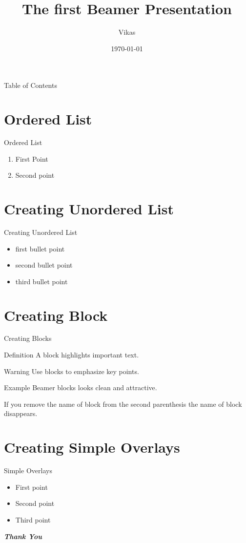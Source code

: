 \documentclass[12 pt]{beamer}
\title{The first Beamer Presentation}
\author{Vikas}
\institute{Ramjas College, UOD}
\date{\today}
\begin{document}
\maketitle
\tableofcontents

\begin{frame}{Table of Contents}
\tableofcontents
\end{frame}
\section{Ordered List}
\begin{frame}{Ordered List}
\begin{enumerate}
\item First Point
\item Second point
\end{enumerate}
\end{frame}
\section{Creating Unordered List}
\begin{frame}{Creating Unordered List}
\begin{itemize}
\item first bullet point
\item second bullet point
\item third bullet point
\end{itemize}
\end{frame}
\section{Creating Block}
\begin{frame}{Creating Blocks}
\begin{block}{Definition}
A block highlights important text.
\end{block}
\begin{alertblock}{Warning}
Use blocks to emphasize key points.
\end{alertblock}
\begin{exampleblock}{Example}
Beamer blocks looks clean and attractive.
\end{exampleblock}
\begin{exampleblock}{}
If you remove the name of block from the second parenthesis the name of block
disappears.
\end{exampleblock}
\end{frame}
\section{Creating Simple Overlays}
\begin{frame}{Simple Overlays}
\begin{itemize}
\item First point \pause
\item Second point \pause
\item Third point
\end{itemize}
\end{frame}
\begin{frame}
\begin{center}
\begin{Huge}
\textit{\textbf{Thank You}}
\end{Huge}
\end{center}
\end{frame}
\end{document}
